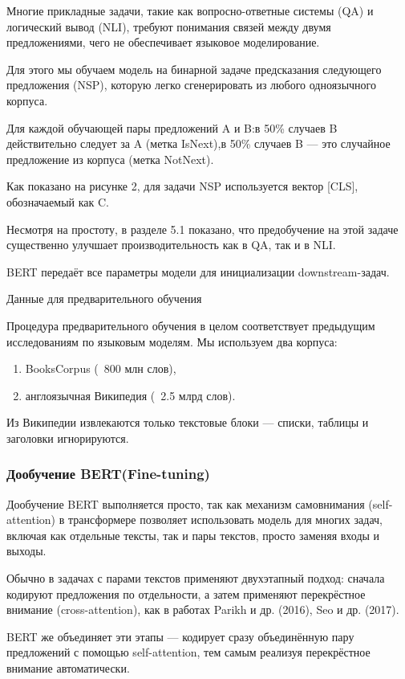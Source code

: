 Многие прикладные задачи, такие как вопросно-ответные системы (QA) и логический вывод (NLI), требуют понимания связей между двумя предложениями, чего не обеспечивает языковое моделирование.

Для этого мы обучаем модель на бинарной задаче предсказания следующего предложения (NSP), которую легко сгенерировать из любого одноязычного корпуса.

Для каждой обучающей пары предложений A и B:в 50\% случаев B действительно следует за A (метка IsNext),в 50\% случаев B — это случайное предложение из корпуса (метка NotNext).

Как показано на рисунке 2, для задачи NSP используется вектор [CLS], обозначаемый как C.

Несмотря на простоту, в разделе 5.1 показано, что предобучение на этой задаче существенно улучшает производительность как в QA, так и в NLI.

 BERT передаёт все параметры модели для инициализации downstream-задач.

Данные для предварительного обучения


Процедура предварительного обучения в целом соответствует предыдущим исследованиям по языковым моделям. Мы используем два корпуса:
\begin{enumerate}[label=\arabic*.]
\item BooksCorpus (~800 млн слов),

\item англоязычная Википедия (~2.5 млрд слов).
\end{enumerate}
Из Википедии извлекаются только текстовые блоки — списки, таблицы и заголовки игнорируются.

\subsubsection{Дообучение BERT(Fine-tuning)}


Дообучение BERT выполняется просто, так как механизм самовнимания (self-attention) в трансформере позволяет использовать модель для многих задач, включая как отдельные тексты, так и пары текстов, просто заменяя входы и выходы.

Обычно в задачах с парами текстов применяют двухэтапный подход: сначала кодируют предложения по отдельности, а затем применяют перекрёстное внимание (cross-attention), как в работах Parikh и др. (2016), Seo и др. (2017).

BERT же объединяет эти этапы — кодирует сразу объединённую пару предложений с помощью self-attention, тем самым реализуя перекрёстное внимание автоматически.

